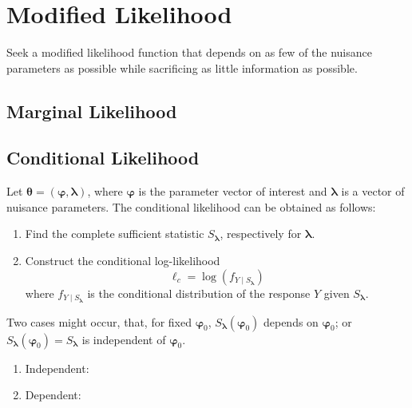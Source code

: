 \chapter{Modified Likelihood}

Seek a modified likelihood function that depends on as few of the nuisance parameters as possible while sacrificing as little information as possible.

\section{Marginal Likelihood}

\section{Conditional Likelihood}

Let $\boldsymbol{\theta}=(\boldsymbol{\varphi},\boldsymbol{\lambda})$, where $\boldsymbol{\varphi}$ is the parameter vector of interest and $\boldsymbol{\lambda}$ is a vector of nuisance parameters. The conditional likelihood can be obtained as follows:
\begin{enumerate}
    \item Find the complete sufficient statistic $S_{\boldsymbol{\lambda}}$, respectively for $\boldsymbol{\lambda}$.
    \item  Construct the conditional log-likelihood
          \begin{equation}
              \ell_{c}=\log\left(f_{Y\mid S_{\boldsymbol{\lambda}}}\right)
          \end{equation}
          where $f_{Y\mid S_{\boldsymbol{\lambda}}}$ is the conditional distribution of the response $Y$ given $S_{\boldsymbol{\lambda}}$.
\end{enumerate}

\begin{note}
    Two cases might occur, that, for fixed $\boldsymbol{\varphi}_{0}$, $S_{\boldsymbol{\lambda}}\left(\boldsymbol{\varphi}_{0}\right)$ depends on $\boldsymbol{\varphi}_{0}$; or $S_{\boldsymbol{\lambda}}\left(\boldsymbol{\varphi}_{0}\right)=S_{\boldsymbol{\lambda}}$ is independent of $\boldsymbol{\varphi}_{0}$.
    \begin{enumerate}
        \item Independent:
        \item Dependent:
    \end{enumerate}
\end{note}

